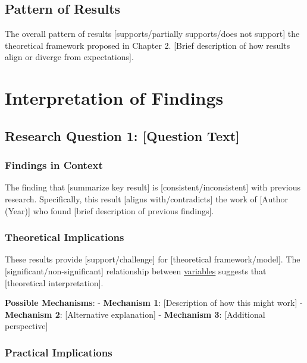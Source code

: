 \documentclass[
  12pt,
  letterpaper,
  12pt,
  letterpaper,
  oneside]{report}
\begin{document}
\subsection{Pattern of Results}\label{pattern-of-results}

The overall pattern of results {[}supports/partially supports/does not
support{]} the theoretical framework proposed in Chapter 2. {[}Brief
description of how results align or diverge from expectations{]}.

\section{Interpretation of Findings}\label{interpretation-of-findings}

\subsection{Research Question 1: {[}Question
Text{]}}\label{research-question-1-question-text-1}

\subsubsection{Findings in Context}\label{findings-in-context}

The finding that {[}summarize key result{]} is
{[}consistent/inconsistent{]} with previous research. Specifically, this
result {[}aligns with/contradicts{]} the work of {[}Author (Year){]} who
found {[}brief description of previous findings{]}.

\subsubsection{Theoretical Implications}\label{theoretical-implications}

These results provide {[}support/challenge{]} for {[}theoretical
framework/model{]}. The {[}significant/non-significant{]} relationship
between \hyperref[variables]{variables} suggests that {[}theoretical
interpretation{]}.

\textbf{Possible Mechanisms}: - \textbf{Mechanism 1}: {[}Description of
how this might work{]} - \textbf{Mechanism 2}: {[}Alternative
explanation{]} - \textbf{Mechanism 3}: {[}Additional perspective{]}

\subsubsection{Practical Implications}\label{practical-implications}
\end{document}
